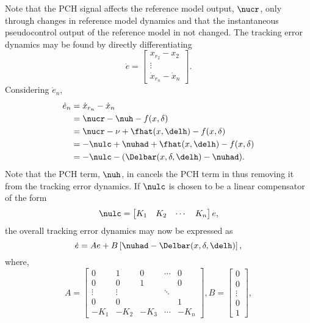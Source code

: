 Note that the PCH signal affects the reference model output, $\nucr$,
only through changes in reference model dynamics and that the
instantaneous pseudocontrol output of the reference model in not
changed. The tracking error dynamics may be found by directly
differentiating 
\begin{equation*}
\dot{e} =
\begin{bmatrix}
x_{r_2} - x_2 \\
\vdots \\
\dot{x}_{r_n} - \dot{x}_{n}
\end{bmatrix}.
\end{equation*}
%
Considering $\dot{e}_n$,
\begin{equation*}
\begin{split}
\dot{e}_n &= \dot{x}_{r_n} - \dot{x}_{n}\\
          &= \nucr - \nuh - f(x,\delta) \\
          &= \nucr - \nu + \fhat(x,\delh) - f(x,\delta) \\
          &= -\nulc + \nuhad + \fhat(x,\delh) - f(x,\delta)\\
          &= -\nulc - (\Delbar(x,\delta,\delh) - \nuhad).
\end{split}
\end{equation*}
Note that the PCH term, $\nuh$, in  cancels the PCH
term in  thus removing it from the tracking error
dynamics. If $\nulc$ is chosen to be a linear compensator of the form
\begin{equation*}
\nulc = \begin{bmatrix}K_1 & K_2 & \cdots & K_n\end{bmatrix}e,
\end{equation*}
%
the overall tracking error dynamics may now be expressed as
\begin{equation}
\label{e:simple:edot} \dot{e} = Ae + B\left[ \nuhad -
\Delbar(x,\delta,\delh)\right],
\end{equation}
where,
\begin{equation*}
A =
\begin{bmatrix}
0      &    1     &    0    &   \cdots    &   0 \\
0      &    0     &    1    &             &   0 \\
\vdots &  \vdots  &         &      \ddots &     \\
0      &    0     &         &             &   1 \\
-K_1   & -K_2     &  -K_3   &     \cdots  &   -K_n
\end{bmatrix},
B =
\begin{bmatrix}
0\\
0\\
\vdots\\
0\\
1
\end{bmatrix},
\end{equation*}

